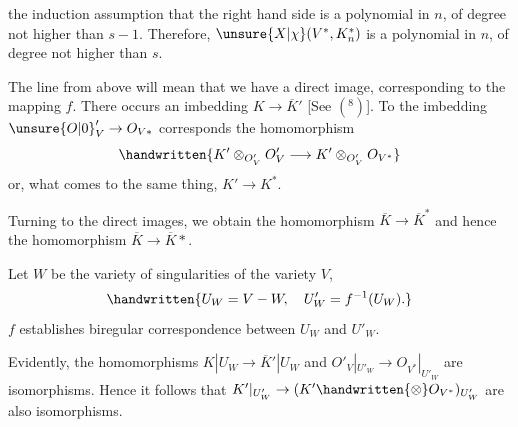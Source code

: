
the induction assumption that the right hand side is a polynomial in $n$, of degree not higher than $s-1$. Therefore, $\unsure{X|\chi}(V^*,K_n^*)$ is a polynomial in $n$, of degree not higher than $s$.

The line from above will mean that we have a direct image, corresponding to the mapping $f$. There occurs an imbedding $K\to\overline K'$ [See $({}^{8})$]. To the imbedding $\unsure{O|0}'_V\to O_{V*}$ corresponds the homomorphism
\[
\handwritten{K'\otimes_{O'_V}O'_V\longrightarrow K'\otimes_{O'_V}O_{V^{*}}}
\]
or, what comes to the same thing, $K'\to K^*$.

Turning to the direct images, we obtain the homomorphism $\overline K\to\overline K^*$ and hence the homomorphism $\overline K\to\overline K{*}$.

Let $W$ be the variety of singularities of the variety $V$,
\[
\handwritten{U_W=V-W,\quad U'_W=f^{-1}(U_W).}
\]
$f$ establishes biregular correspondence between $U_W$ and $U'_W$.

Evidently, the homomorphisms $K|U_W\to\overline K'|U_W$ and $O'_V|_{U'_W}\to O_{V^{*}}|_{U'_W}$ are isomorphisms. Hence it follows that $K'|_{U'_W}\to(K'\handwritten{\otimes} O_{V^{*}})_{U'_W}$ are also isomorphisms.

